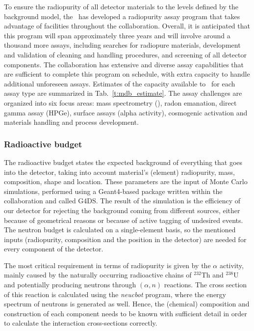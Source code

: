 To ensure the radiopurity of all detector materials to the levels defined by the background model, the \MAWG\ has developed a radiopurity assay program that takes advantage of facilities throughout the collaboration. Overall, it is anticipated that this program will span approximately three years and will involve around a thousand more assays, including searches for radiopure materials, development and validation of cleaning and handling procedures, and screening of all detector components. The collaboration has extensive and diverse assay capabilities that are sufficient to complete this program on schedule, with extra capacity to handle additional unforeseen assays. Estimates of the capacity available to \DSks\ for each assay type are summarized in Tab.~\ref{t:mdb_estimate}. The assay challenges are organized into six focus areas: mass spectrometry (\ICPMS), radon emanation, direct gamma assay (HPGe), surface assays (alpha activity), cosmogenic activation and materials handling and process development.


\subsubsection{Radioactive budget}
\label{sec:Mat-Bdg}

The radioactive budget states the expected background of everything that goes into the detector, taking into account material's (element) radiopurity, mass, composition, shape and location. These parameters are the input of Monte Carlo simulations, performed using a Geant4-based package written within the collaboration and called G4DS. The result of the simulation is the efficiency of our detector for rejecting the background coming from different sources, either because of geometrical reasons or because of active tagging of undesired events. The neutron budget is calculated on a single-element basis, so the mentioned inputs (radiopurity, composition and the position in the detector) are needed for every component of the detector.

The most critical requirement in terms of radiopurity is given by the $\alpha$ activity, mainly caused by the naturally occurring radioactive chains of $^{232}$Th and $^{238}$U and potentially producing neutrons through $(\alpha,n)$ reactions. The cross section of this reaction is calculated using the {\it neucbot} program, where the energy spectrum of neutrons is generated as well. Hence, the (chemical) composition and construction of each component needs to be known with sufficient detail in order to calculate the interaction cross-sections correctly.

